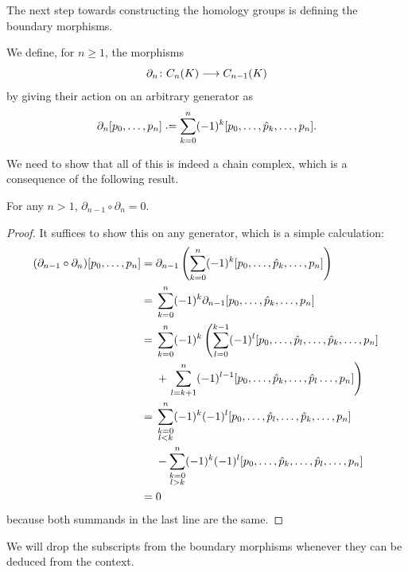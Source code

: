 \documentclass[../main.tex]{subfiles}
\begin{document}
The next step towards constructing the homology groups is defining the boundary morphisms.
\begin{definition}
	We define, for \( n \geq 1 \), the morphisms
	\begin{equation*}
		\partial_n \colon C_n(K) \longrightarrow C_{n-1}(K)
	\end{equation*}
	by giving their action on an arbitrary generator as
	\begin{equation*}
		\partial_n [p_0, \dots, p_n] \defeq \sum_{k = 0}^{n} (-1)^k [p_0, \dots, \hat p_k,
		\dots, p_n]. 
	\end{equation*}
\end{definition}
We need to show that all of this is indeed a chain complex, which is a consequence of the
following result.
\begin{lemma}
		For any \( n > 1 \), \( \partial_{n-1} \circ \partial_n = 0 \). 
\end{lemma}
\begin{proof}
	It suffices to show this on any generator, which is a simple calculation:
	\begin{align*}
		(\partial_{n-1} \circ \partial_n)[p_0, \dots, p_n] = {} & \partial_{n-1}\left(\sum_{k
		=		0}^{n}(-1)^k[p_0, \dots, \hat p_k, \dots, p_n]\right) \\
				= {} & \sum_{k = 0}^{n}(-1)^k	\partial_{n-1}[p_0, \dots, \hat	p_k, \dots, p_n] \\
				= {} & \sum_{k = 0}^{n}(-1)^k	\left(\sum_{l = 0}^{k - 1} (-1)^l [p_0, \dots, \hat	p_l, \dots, \hat p_k, \dots, p_n] \right. \\
						 & {} + \left. \sum_{l = k+1}^{n}(-1)^{l-1} [p_0, \dots, \hat p_k, \dots, \hat
						 p_l \dots, p_n]\right) \\
				= {} & \sum_{\mathclap{\substack{k = 0 \\ l < k}}}^n (-1)^k(-1)^l [p_0,	\dots,
				\hat p_l, \dots, \hat p_k, \dots, p_n] \\
						 & {} - \sum_{\mathclap{\substack{k = 0 \\ l > k}}}^n (-1)^k(-1)^l [p_0,
						 \dots, \hat p_k, \dots, \hat p_l, \dots, p_n] \\
				= {} & 0
	\end{align*}
	because both summands in the last line are the same. 
\end{proof}
We will drop the subscripts from the boundary morphisms whenever they can be deduced from
the context. 
\end{document}

